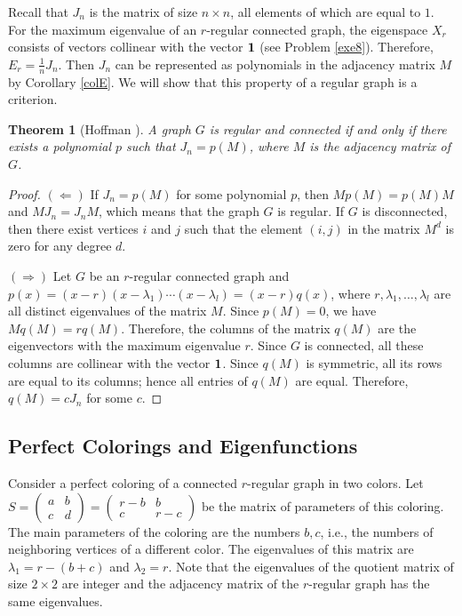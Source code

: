 \documentclass[11pt]{article}
\newtheorem{theorem}{Theorem}[section]
\theoremstyle{definition}
\begin{document}
Recall that  $J_n$ is the matrix of size $n\times n$, all elements of which
are equal to $1$. For the maximum eigenvalue of an $r$-regular connected graph, the eigenspace $X_r$
consists of vectors collinear with the vector ${\bf 1}$ (see Problem
\ref{exe8}). Therefore, $E_r=\frac{1}{n}J_n$. Then $J_n$ can be represented as polynomials in the adjacency matrix
$M$ by Corollary \ref{colE}. We will show that this property of a regular
graph is a criterion.

\begin{theorem}[Hoffman \cite{Godsil}]
A graph $G$ is regular and connected if and only if
there exists a polynomial $p$ such that $J_n=p(M)$, where $M$ is the adjacency matrix
of $G$.
\end{theorem}
\begin{proof}

$(\Leftarrow) $ If $J_n = p(M)$ for some polynomial $p$, then
$Mp(M) = p(M)M$ and $MJ_n = J_nM$, which means that the graph
$G$ is regular. If $G$ is disconnected, then there exist vertices  $i$
and $j$ such that the element $(i, j)$ in the matrix $M^d$ is zero for
any degree $d$.

$(\Rightarrow)$ Let $G$ be an $r$-regular connected graph and $p(x) =
(x-r)(x-\lambda_1)\cdots(x-\lambda_l) = (x-r)q(x)$, where
$r,\lambda_1,\dots,\lambda_l$ are all distinct eigenvalues
of the matrix $M$. Since $p(M) = 0$, we have $Mq(M) = rq(M)$. Therefore,
the columns of the matrix $q(M)$ are the eigenvectors with
the maximum eigenvalue $r$. Since $G$ is connected, all
these columns are collinear with the vector ${\bf 1}$. Since $q(M)$ is
symmetric, all its rows are equal to its columns; hence all entries of $q(M)$ are equal.
Therefore, $q(M) = cJ_n$
for some $c$. \end{proof}

\subsection{Perfect Colorings and Eigenfunctions}

Consider a perfect coloring of a connected $r$-regular graph in
two colors. Let $S=\begin{pmatrix}
a & b \\
c & d
\end{pmatrix}=\begin{pmatrix}
r-b & b \\
c & r-c
\end{pmatrix}$ be the matrix of parameters of this coloring.
The main parameters of the coloring are the numbers $b, c$, i.e., the numbers
of neighboring vertices of a different color. The eigenvalues
of this matrix are  $\lambda_1=r-(b+c)$ and $\lambda_2=r$.
Note that the eigenvalues of the quotient  matrix of size $2\times 2$ are integer and 
 the adjacency matrix of  the $r$-regular graph has the same  eigenvalues.
\end{document}
